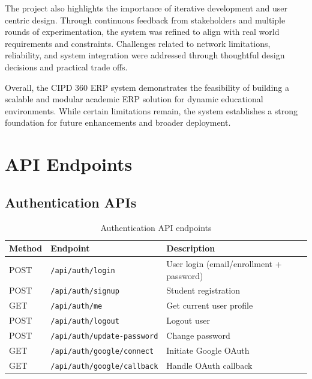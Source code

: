 The project also highlights the importance of iterative development and user centric design. Through
continuous feedback from stakeholders and multiple rounds of experimentation, the system was
refined to align with real world requirements and constraints. Challenges related to network
limitations, reliability, and system integration were addressed through thoughtful design decisions
and practical trade offs.

Overall, the CIPD 360 ERP system demonstrates the feasibility of building a scalable and modular
academic ERP solution for dynamic educational environments. While certain limitations remain, the
system establishes a strong foundation for future enhancements and broader deployment.

\appendix
\chapter{API Endpoints}

\section{Authentication APIs}

\begin{table}[!ht]
    \centering
    \begin{tabular}{|l|l|p{6.5cm}|}
    \hline
    \textbf{Method} & \textbf{Endpoint} & \textbf{Description} \\ \hline
    POST  & \texttt{/api/auth/login}              & User login (email/enrollment + password) \\
    POST  & \texttt{/api/auth/signup}             & Student registration \\
    GET   & \texttt{/api/auth/me}                & Get current user profile \\
    POST  & \texttt{/api/auth/logout}            & Logout user \\
    POST  & \texttt{/api/auth/update-password}   & Change password \\
    GET   & \texttt{/api/auth/google/connect}    & Initiate Google OAuth \\
    GET   & \texttt{/api/auth/google/callback}   & Handle OAuth callback \\ \hline
    \end{tabular}
    \caption{Authentication API endpoints}
    \label{tab:api_auth}
\end{table}


